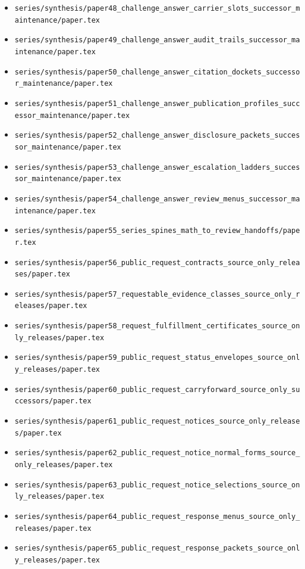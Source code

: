 \documentclass[11pt]{article}
\begin{document}
\begin{itemize}[leftmargin=*]
\item \texttt{series/synthesis/paper48\_challenge\_answer\_carrier\_slots\_successor\_maintenance/paper.tex}
\item \texttt{series/synthesis/paper49\_challenge\_answer\_audit\_trails\_successor\_maintenance/paper.tex}
\item \texttt{series/synthesis/paper50\_challenge\_answer\_citation\_dockets\_successor\_maintenance/paper.tex}
\item \texttt{series/synthesis/paper51\_challenge\_answer\_publication\_profiles\_successor\_maintenance/paper.tex}
\item \texttt{series/synthesis/paper52\_challenge\_answer\_disclosure\_packets\_successor\_maintenance/paper.tex}
\item \texttt{series/synthesis/paper53\_challenge\_answer\_escalation\_ladders\_successor\_maintenance/paper.tex}
\item \texttt{series/synthesis/paper54\_challenge\_answer\_review\_menus\_successor\_maintenance/paper.tex}
\item \texttt{series/synthesis/paper55\_series\_spines\_math\_to\_review\_handoffs/paper.tex}
\item \texttt{series/synthesis/paper56\_public\_request\_contracts\_source\_only\_releases/paper.tex}
\item \texttt{series/synthesis/paper57\_requestable\_evidence\_classes\_source\_only\_releases/paper.tex}
\item \texttt{series/synthesis/paper58\_request\_fulfillment\_certificates\_source\_only\_releases/paper.tex}
\item \texttt{series/synthesis/paper59\_public\_request\_status\_envelopes\_source\_only\_releases/paper.tex}
\item \texttt{series/synthesis/paper60\_public\_request\_carryforward\_source\_only\_successors/paper.tex}
\item \texttt{series/synthesis/paper61\_public\_request\_notices\_source\_only\_releases/paper.tex}
\item \texttt{series/synthesis/paper62\_public\_request\_notice\_normal\_forms\_source\_only\_releases/paper.tex}
\item \texttt{series/synthesis/paper63\_public\_request\_notice\_selections\_source\_only\_releases/paper.tex}
\item \texttt{series/synthesis/paper64\_public\_request\_response\_menus\_source\_only\_releases/paper.tex}
\item \texttt{series/synthesis/paper65\_public\_request\_response\_packets\_source\_only\_releases/paper.tex}

\end{itemize}
\end{document}
